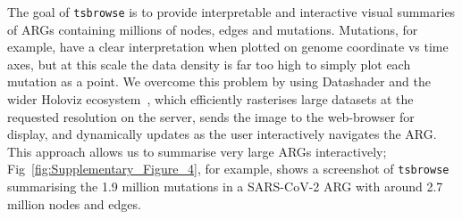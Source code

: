 \documentclass[unnumsec,webpdf,contemporary,large,namedate]{oup-authoring-template}%
\begin{document}
The goal of \texttt{tsbrowse} is to provide interpretable
and interactive visual summaries of ARGs containing millions of nodes, edges
and mutations. Mutations, for example, have a clear interpretation
when plotted on genome coordinate vs time axes, but at this scale
the data density is far too high to simply plot each mutation as a point.
We overcome this problem by using Datashader and the wider
Holoviz ecosystem~\citep{Holoviz}, which efficiently rasterises large datasets
at the requested resolution on the server, sends the image to the web-browser
for display, and dynamically updates as the user interactively navigates the
ARG.
This approach allows us to summarise very large ARGs interactively;
Fig~\ref{fig:Supplementary_Figure_4}, for example, shows a screenshot of
\texttt{tsbrowse} summarising the 1.9 million mutations in a SARS-CoV-2
ARG with around 2.7 million nodes and edges.


\end{document}
